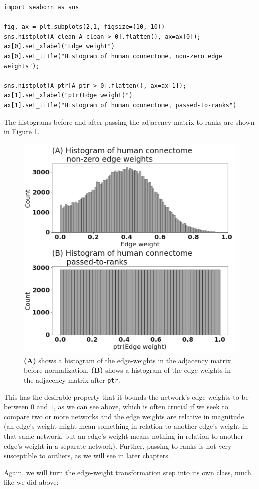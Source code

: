 \begin{lstlisting}[style=python]
import seaborn as sns

fig, ax = plt.subplots(2,1, figsize=(10, 10))
sns.histplot(A_clean[A_clean > 0].flatten(), ax=ax[0]);
ax[0].set_xlabel("Edge weight")
ax[0].set_title("Histogram of human connectome, non-zero edge weights");

sns.histplot(A_ptr[A_ptr > 0].flatten(), ax=ax[1]);
ax[1].set_xlabel("ptr(Edge weight)")
ax[1].set_title("Histogram of human connectome, passed-to-ranks")
\end{lstlisting}
The histograms before and after passing the adjacency matrix to ranks are shown in Figure \ref{fig:ch2:ptrhists}.

\begin{figure}[h]
    \centering
    \includegraphics[width=0.6\linewidth]{foundations/ch2/Images/ptrhists.png}
    \caption[Histograms of connectome edge weights]{\textbf{(A)} shows a histogram of the edge-weights in the adjacency matrix before normalization. \textbf{(B)} shows a histogram of the edge weights in the adjacency matrix after \texttt{ptr}.}
    \label{fig:ch2:ptrhists}
\end{figure}

This has the desirable property that it bounds the network's edge weights to be between $0$ and $1$, as we can see above, which is often crucial if we seek to compare two or more networks and the edge weights are relative in magnitude (an edge's weight might mean something in relation to another edge's weight in that same network, but an edge's weight means nothing in relation to another edge's weight in a separate network). Further, passing to ranks is not very susceptible to outliers, as we will see in later chapters. 

Again, we will turn the edge-weight transformation step into its own class, much like we did above:

